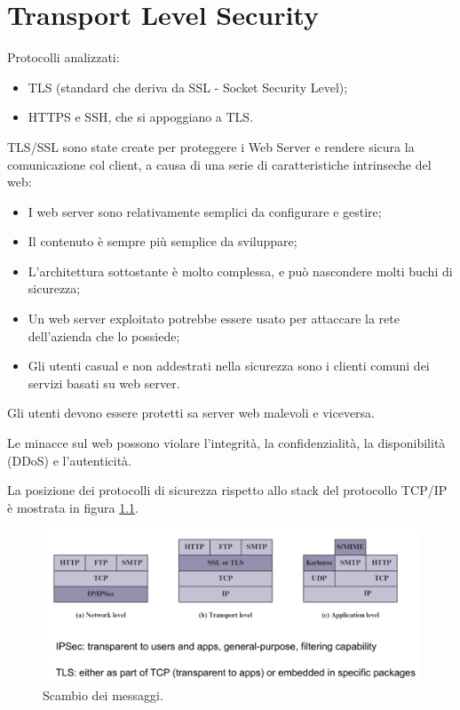 \setchapterpreamble[u]{\margintoc}
\chapter{Transport Level Security}

Protocolli analizzati: 
\begin{itemize}
    \item TLS (standard che deriva da SSL - Socket Security Level);
	\item HTTPS e SSH, che si appoggiano a TLS.
\end{itemize}

TLS/SSL sono state create per proteggere i Web Server e rendere sicura la comunicazione col client, a causa di una serie di caratteristiche intrinseche del web:
\begin{itemize}
    \item I web server sono relativamente semplici da configurare e gestire;
	\item Il contenuto è sempre più semplice da sviluppare;
	\item L'architettura sottostante è molto complessa, e può nascondere molti buchi di sicurezza;
	\item Un web server exploitato potrebbe essere usato per attaccare la rete dell'azienda che lo possiede;
	\item Gli utenti casual e non addestrati nella sicurezza sono i clienti comuni dei servizi basati su web server.
\end{itemize}
Gli utenti devono essere protetti sa server web malevoli e viceversa.

Le minacce sul web possono violare l'integrità, la confidenzialità, la disponibilità (DDoS) e l'autenticità.

La posizione dei protocolli di sicurezza rispetto allo stack del protocollo TCP/IP è mostrata in figura \ref{fig:5-1}.

\begin{figure}
    \centering
    \includegraphics[width=1\textwidth]{images/chapter5/5-1.png}
    \caption{Scambio dei messaggi.}
    \label{fig:5-1}
\end{figure}

